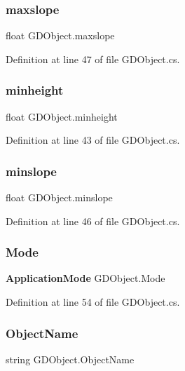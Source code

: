 \subsubsection{maxslope}
{\footnotesize\ttfamily float G\+D\+Object.\+maxslope}



Definition at line 47 of file G\+D\+Object.\+cs.

\mbox{\label{class_g_d_object_a860ce974ec058a44364925ddb1f129dd}} 
\subsubsection{minheight}
{\footnotesize\ttfamily float G\+D\+Object.\+minheight}



Definition at line 43 of file G\+D\+Object.\+cs.

\mbox{\label{class_g_d_object_adfea20f71726d3a72a43b63f0d608ab7}} 
\subsubsection{minslope}
{\footnotesize\ttfamily float G\+D\+Object.\+minslope}



Definition at line 46 of file G\+D\+Object.\+cs.

\mbox{\label{class_g_d_object_afcf5006924178ba41a10d3338c4ae90f}} 
\subsubsection{Mode}
{\footnotesize\ttfamily \textbf{ Application\+Mode} G\+D\+Object.\+Mode}



Definition at line 54 of file G\+D\+Object.\+cs.

\mbox{\label{class_g_d_object_a6ac5bf1c5ed218b929038809a3be8d7d}} 
\subsubsection{Object\+Name}
{\footnotesize\ttfamily string G\+D\+Object.\+Object\+Name}



